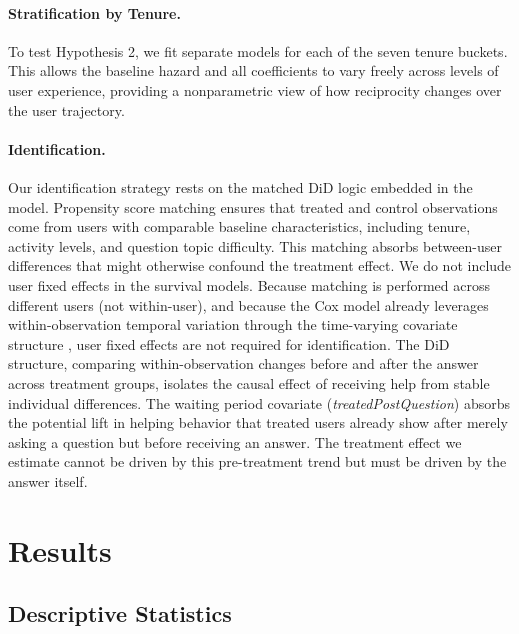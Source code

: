 \paragraph{Stratification by Tenure.} To test Hypothesis 2, we fit separate models for each of the seven tenure buckets. This allows the baseline hazard and all coefficients to vary freely across levels of user experience, providing a nonparametric view of how reciprocity changes over the user trajectory.

\paragraph{Identification.} Our identification strategy rests on the matched DiD logic embedded in the model. Propensity score matching \citep{rosenbaum_rubin_1983} ensures that treated and control observations come from users with comparable baseline characteristics, including tenure, activity levels, and question topic difficulty. This matching absorbs between-user differences that might otherwise confound the treatment effect. We do not include user fixed effects in the survival models. Because matching is performed across different users (not within-user), and because the Cox model already leverages within-observation temporal variation through the time-varying covariate structure \citep{andersen_gill_1982}, user fixed effects are not required for identification. The DiD structure, comparing within-observation changes before and after the answer across treatment groups, isolates the causal effect of receiving help from stable individual differences. The waiting period covariate (\textit{treatedPostQuestion}) absorbs the potential lift in helping behavior that treated users already show after merely asking a question but before receiving an answer. The treatment effect we estimate cannot be driven by this pre-treatment trend but must be driven by the answer itself.

\section{Results}
\label{sec:results}

\subsection{Descriptive Statistics}

